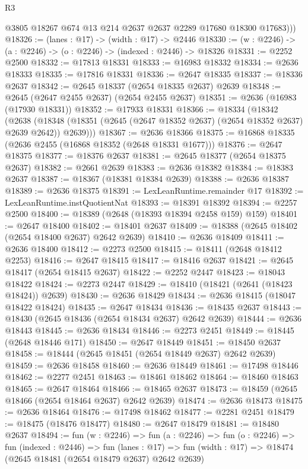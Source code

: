 \begin{lexlean}{R3}
\begin{coremodule}
        @3805 @18267 @674 @13 @214 @2637 @2637 @2289 @17680 @18300 @17683)))
@18326 := (lanes : @17) -> (width : @17) -> @2446
@18330 := (w : @2246) -> (a : @2246) -> (o : @2246) -> (indexed : @2446) -> @18326
@18331 := @2252 @2500
@18332 := @17813 @18331
@18333 := @16983 @18332
@18334 := @2636 @18333
@18335 := @17816 @18331
@18336 := @2647 @18335
@18337 := @18336 @2637
@18342 := @2645 @18337 (@2654 @18335 @2637) @2639
@18348 := @2645 (@2647 @2455 @2637) (@2654 @2455 @2637)
@18351 := @2636 (@16983 (@17930 @18331))
@18352 := @17933 @18331
@18366 := @18334
    (@18342
      (@2638 (@18348 (@18351 (@2645 (@2647 @18352 @2637) (@2654 @18352 @2637) @2639 @2642)) @2639)))
@18367 := @2636 @18366
@18375 := @16868 @18335 (@2636 @2455 (@16868 @18352 (@2648 @18331 @1677)))
@18376 := @2647 @18375
@18377 := @18376 @2637
@18381 := @2645 @18377 (@2654 @18375 @2637)
@18382 := @2661 @2639
@18383 := @2636 @18382
@18384 := @18383 @2637
@18387 := @18367 (@18381 @18384 @2639)
@18388 := @2636 @18387
@18389 := @2636 @18375
@18391 := LexLeanRuntime.remainder @17
@18392 := LexLeanRuntime.instQuotientNat
@18393 := @18391 @18392
@18394 := @2257 @2500
@18400 := @18389 (@2648 (@18393 @18394 @2458 @159) @159)
@18401 := @2647 @18400
@18402 := @18401 @2637
@18409 := @18388 (@2645 @18402 (@2654 @18400 @2637) @2642 @2639)
@18410 := @2636 @18409
@18411 := @2636 @18400
@18412 := @2273 @2500
@18415 := @18411 (@2648 @18412 @2253)
@18416 := @2647 @18415
@18417 := @18416 @2637
@18421 := @2645 @18417 (@2654 @18415 @2637)
@18422 := @2252 @2447
@18423 := @18043 @18422
@18424 := @2273 @2447
@18429 := @18410 (@18421 (@2641 (@18423 @18424)) @2639)
@18430 := @2636 @18429
@18434 := @2636 @18415 (@18047 @18422 @18424)
@18435 := @2647 @18434
@18436 := @18435 @2637
@18443 := @18430 (@2645 @18436 (@2654 @18434 @2637) @2642 @2639)
@18444 := @2636 @18443
@18445 := @2636 @18434
@18446 := @2273 @2451
@18449 := @18445 (@2648 @18446 @171)
@18450 := @2647 @18449
@18451 := @18450 @2637
@18458 := @18444 (@2645 @18451 (@2654 @18449 @2637) @2642 @2639)
@18459 := @2636 @18458
@18460 := @2636 @18449
@18461 := @17498 @18446
@18462 := @2277 @2451
@18463 := @18461 @18462
@18464 := @18460 @18463
@18465 := @2647 @18464
@18466 := @18465 @2637
@18473 := @18459 (@2645 @18466 (@2654 @18464 @2637) @2642 @2639)
@18474 := @2636 @18473
@18475 := @2636 @18464
@18476 := @17498 @18462
@18477 := @2281 @2451
@18479 := @18475 (@18476 @18477)
@18480 := @2647 @18479
@18481 := @18480 @2637
@18494 := fun (w : @2246) =>
  fun (a : @2246) =>
  fun (o : @2246) =>
  fun (indexed : @2446) =>
  fun (lanes : @17) => fun (width : @17) => @18474 (@2645 @18481 (@2654 @18479 @2637) @2642 @2639)

\end{coremodule}
\end{lexlean}
